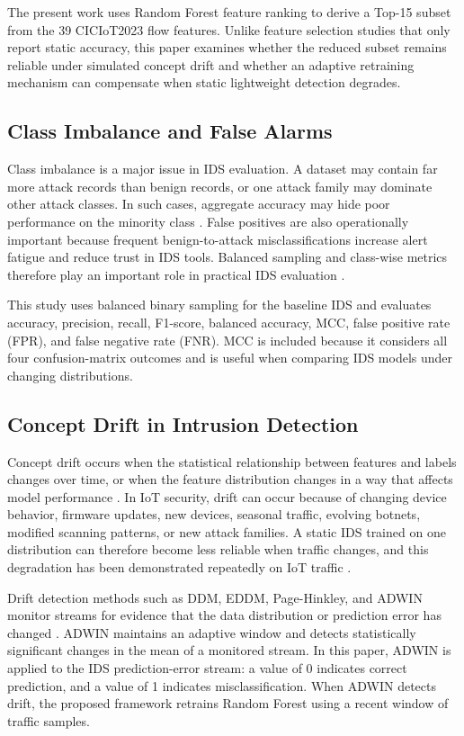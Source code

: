 \documentclass[11pt,a4paper]{article}
\begin{document}
The present work uses Random Forest feature ranking to derive a Top-15
subset from the 39 CICIoT2023 flow features. Unlike feature selection
studies that only report static accuracy, this paper examines whether
the reduced subset remains reliable under simulated concept drift and
whether an adaptive retraining mechanism can compensate when static
lightweight detection degrades.

\subsection{Class Imbalance and False Alarms}

Class imbalance is a major issue in IDS evaluation. A dataset may
contain far more attack records than benign records, or one attack
family may dominate other attack classes. In such cases, aggregate
accuracy may hide poor performance on the minority class
\cite{chawla2002,zoghi2021}. False positives are also operationally
important because frequent benign-to-attack misclassifications increase
alert fatigue and reduce trust in IDS tools. Balanced sampling and
class-wise metrics therefore play an important role in practical IDS
evaluation \cite{musthafa2024,shanmugam2025}.

This study uses balanced binary sampling for the baseline IDS and
evaluates accuracy, precision, recall, F1-score, balanced accuracy, MCC,
false positive rate (FPR), and false negative rate (FNR). MCC is
included because it considers all four confusion-matrix outcomes and is
useful when comparing IDS models under changing distributions.

\subsection{Concept Drift in Intrusion Detection}

Concept drift occurs when the statistical relationship between features
and labels changes over time, or when the feature distribution changes
in a way that affects model performance \cite{gama2014}. In IoT
security, drift can occur because of changing device behavior, firmware
updates, new devices, seasonal traffic, evolving botnets, modified
scanning patterns, or new attack families. A static IDS trained on one
distribution can therefore become less reliable when traffic changes,
and this degradation has been demonstrated repeatedly on IoT traffic
\cite{wahab2022,chu2023,agate2024}.

Drift detection methods such as DDM, EDDM, Page-Hinkley, and ADWIN
monitor streams for evidence that the data distribution or prediction
error has changed \cite{gama2004,bifet2007}. ADWIN maintains an adaptive
window and detects statistically significant changes in the mean of a
monitored stream. In this paper, ADWIN is applied to the IDS
prediction-error stream: a value of 0 indicates correct prediction, and
a value of 1 indicates misclassification. When ADWIN detects drift, the
proposed framework retrains Random Forest using a recent window of
traffic samples.
\end{document}
